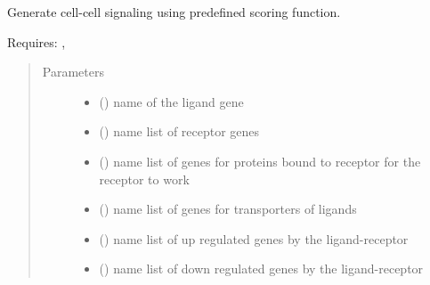 \documentclass[letterpaper,10pt,english]{sphinxmanual}
\begin{document}
\begin{fulllineitems}
\begin{fulllineitems}
\begin{quote}
\begin{description}
\end{description}\end{quote}

\end{fulllineitems}


\begin{fulllineitems}
\label{\detokenize{api:spaotsc.SpaOTsc.spatial_sc.spatial_signaling_scoring}}
Generate cell-cell signaling using predefined scoring function.

Requires: , 
\begin{quote}\begin{description}
\item[{Parameters}] \leavevmode\begin{itemize}
\item {} 
 () \textendash{} name of the ligand gene

\item {} 
 () \textendash{} name list of receptor genes

\item {} 
 (\sphinxstyleliteralemphasis{, }) \textendash{} name list of genes for proteins bound to receptor for the receptor to work

\item {} 
 (\sphinxstyleliteralemphasis{, }) \textendash{} name list of genes for transporters of ligands

\item {} 
 () \textendash{} name list of up regulated genes by the ligand-receptor

\item {} 
 () \textendash{} name list of down regulated genes by the ligand-receptor


\end{itemize}
\end{description}
\end{quote}
\end{fulllineitems}
\end{fulllineitems}
\end{document}

